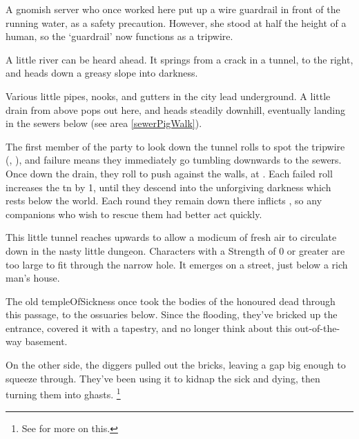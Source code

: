 \begin{multicols}{2}
\begin{exampletext}
  A gnomish \gls{server} who once worked here put up a wire guardrail in front of the running water, as a safety precaution.
  However, she stood at half the height of a human, so the `guardrail' now functions as a tripwire.
\end{exampletext}

\begin{boxtext}
  A little river can be heard ahead.
  It springs from a crack in a tunnel, to the right, and heads down a greasy slope into darkness.
\end{boxtext}

Various little pipes, nooks, and gutters in the city lead underground.
A little drain from above pops out here, and heads steadily downhill, eventually landing in the sewers below (see area \vref{sewerPigWalk}).

The first member of the party to look down the tunnel rolls to spot the tripwire (, \tn[8]), and failure means they immediately go tumbling downwards to the sewers.
Once down the drain, they roll  to push against the walls, at \tn[9].
Each failed roll increases the \gls{tn} by 1, until they descend into the unforgiving darkness which rests below the world.
Each round they remain down there inflicts , so any companions who wish to rescue them had better act quickly.


This little tunnel reaches upwards to allow a modicum of fresh air to circulate down in the nasty little dungeon.
Characters with a Strength of 0 or greater are too large to fit through the narrow hole.
It emerges on a street, just below a rich man's house.


\begin{exampletext}
  The old \gls{templeOfSickness} once took the bodies of the honoured dead through this passage, to the ossuaries below.
  Since the flooding, they've bricked up the entrance, covered it with a tapestry, and no longer think about this out-of-the-way basement.

  On the other side, the \glspl{digger} pulled out the bricks, leaving a gap big enough to squeeze through.
  They've been using it to kidnap the sick and dying, then turning them into ghasts.%
  \footnote{See  for more on this.}
\end{exampletext}


\end{multicols}
